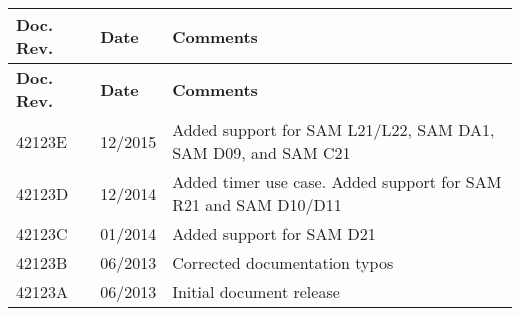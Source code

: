 \tabulinesep=1mm
\begin{longtabu}spread 0pt [c]{*{3}{|X[-1]}|}
\hline
\cellcolor{\tableheadbgcolor}\textbf{ Doc. Rev. }&\cellcolor{\tableheadbgcolor}\textbf{ Date }&\cellcolor{\tableheadbgcolor}\textbf{ Comments  }\\
\endfirsthead
\hline
\endfoot
\hline
\cellcolor{\tableheadbgcolor}\textbf{ Doc. Rev. }&\cellcolor{\tableheadbgcolor}\textbf{ Date }&\cellcolor{\tableheadbgcolor}\textbf{ Comments  }\\
\endhead
42123E &12/2015 &Added support for SAM L21/\+L22, SAM DA1, SAM D09, and SAM C21  \\
42123D &12/2014 &Added timer use case. Added support for SAM R21 and SAM D10/\+D11  \\
42123C &01/2014 &Added support for SAM D21  \\
42123B &06/2013 &Corrected documentation typos  \\
42123A &06/2013 &Initial document release  \\
\end{longtabu}
